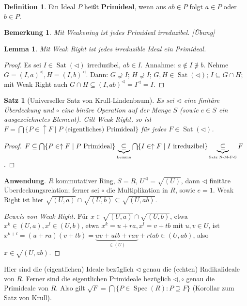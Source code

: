 \documentclass[headsepline=true,DIV=11]{scrartcl}
\newtheorem*{theorem}{Satz}
\newtheorem*{lemma}{Lemma}
\newtheorem*{remark}{Bemerkung}
\theoremstyle{definition}
\newtheorem*{definition}{Definition}
\newcommand{\Spec}{\operatorname{Spec}}
\newcommand{\Sat}{\operatorname{Sat}}
\begin{document}
\begin{definition}
  Ein Ideal $P$ heißt {\bf Primideal}, wenn aus $ab\in P$ folgt $a\in P$ oder $b\in P$.
\end{definition}

\begin{remark}
  Mit Weakening ist jedes Primideal irreduzibel. [Übung]
\end{remark}

\begin{lemma}
  Mit Weak Right ist jedes irreduzible Ideal ein Primideal.
\end{lemma}

\begin{proof}
  Es sei $I\in\Sat(\lhd)$ irreduzibel, $ab\in I$. Annahme: $a\not\in I\not\ni b$. Nehme $G=(I,a)^\lhd,H=(I,b)^\lhd$. Dann: $G\supsetneq I$;
  $H\supsetneq I$; $G,H\in\Sat(\lhd)$; $I\subseteq G\cap H$; mit Weak Right auch $G\cap H\subseteq (I,ab)^\lhd=I^\lhd=I$.
\end{proof}

\begin{theorem}[Universeller Satz von Krull-Lindenbaum]
  Es sei $\lhd$ eine finitäre Überdeckung und $\circ$ eine binäre Operation auf der Menge $S$ (sowie $e\in S$ ein ausgezeichnetes Element). Gilt Weak
  Right, so ist $F=\bigcap\{P\in\uparrow F\mid P\mbox{ (eigentliches) Primideal}\}$ für jedes $F\in\Sat(\lhd)$.
\end{theorem}

\begin{proof}
  $F\subseteq\bigcap\{P\in\uparrow F\mid P\mbox{ Primideal}\}\underbrace{\subseteq}_{\mbox{\tiny Lemma}}\bigcap\{I\in\uparrow F\mid I\mbox{
    irreduzibel}\}\underbrace{\subseteq}_{\mbox{\tiny Satz N-M-F-S}} F$.
\end{proof}

{\bf Anwendung}. $R$ kommutativer Ring, $S=R$, $U^\lhd=\sqrt{(U)}$, dann $\lhd$ finitäre Überdeckungsrelation; ferner sei $\circ$ die Multiplikation
in $R$, sowie $e=1$. Weak Right ist hier $\sqrt{(U,a)}\cap\sqrt{(U,b)}\subseteq\sqrt{(U,ab)}$.

\begin{proof}[Beweis von Weak Right]
  Für $x\in\sqrt{(U,a)}\cap\sqrt{(U,b)}$, etwa $x^k\in(U,a),x^l\in(U,b)$, etwa $x^k=u+ra,x^l=v+tb$ mit $u,v\in U$, ist
  $x^{k+l}=(u+ra)(v+tb)=\underbrace{uv+utb+rav}_{\in(U)}+rtab\in(U,ab)$, also $x\in\sqrt{(U,ab)}$.
\end{proof}

Hier sind die (eigentlichen) Ideale bezüglich $\lhd$ genau die (echten) Radikalideale von $R$. Ferner sind die eigentlichen Primideale bezüglich
$\lhd,\circ$ genau die Primideale von $R$. Also gilt $\sqrt{F}=\bigcap\{P\in\Spec(R):P\supseteq F\}$ (Korollar zum Satz von Krull).
\end{document}
